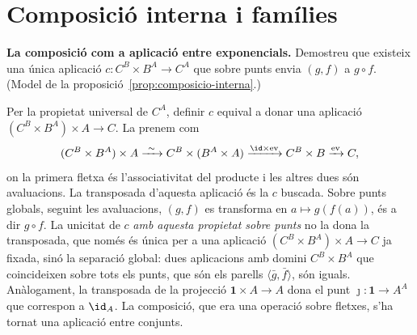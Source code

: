 \section{Composició interna i famílies}\label{prac:exp-composicio}

\begin{exercici}
\textbf{La composició com a aplicació entre exponencials.} Demostreu que existeix una única aplicació \(c\colon C^{B}\times B^{A}\to C^{A}\) que sobre punts envia \((g,f)\) a \(g\circ f\). (Model de la proposició~\ref{prop:composicio-interna}.)
\end{exercici}
\begin{solucio}
Per la propietat universal de \(C^{A}\), definir \(c\) equival a donar una aplicació \((C^{B}\times B^{A})\times A\to C\). La prenem com
\[
(C^{B}\times B^{A})\times A\xrightarrow{\ \sim\ }C^{B}\times(B^{A}\times A)\xrightarrow{\id\times\operatorname{ev}}C^{B}\times B\xrightarrow{\operatorname{ev}}C,
\]
on la primera fletxa és l'associativitat del producte i les altres dues són avaluacions. La transposada d'aquesta aplicació és la \(c\) buscada. Sobre punts globals, seguint les avaluacions, \((g,f)\) es transforma en \(a\mapsto g(f(a))\), és a dir \(g\circ f\). La unicitat de \(c\) \emph{amb aquesta propietat sobre punts} no la dona la transposada, que només és única per a una aplicació \((C^B\times B^A)\times A\to C\) ja fixada, sinó la separació global: dues aplicacions amb domini \(C^B\times B^A\) que coincideixen sobre tots els punts, que són els parells \(\langle\bar g,\bar f\rangle\), són iguals. Anàlogament, la transposada de la projecció \(\mathbf1\times A\to A\) dona el punt \(\jmath\colon\mathbf1\to A^{A}\) que correspon a \(\id_A\). La composició, que era una operació sobre fletxes, s'ha tornat una aplicació entre conjunts.
\end{solucio}

